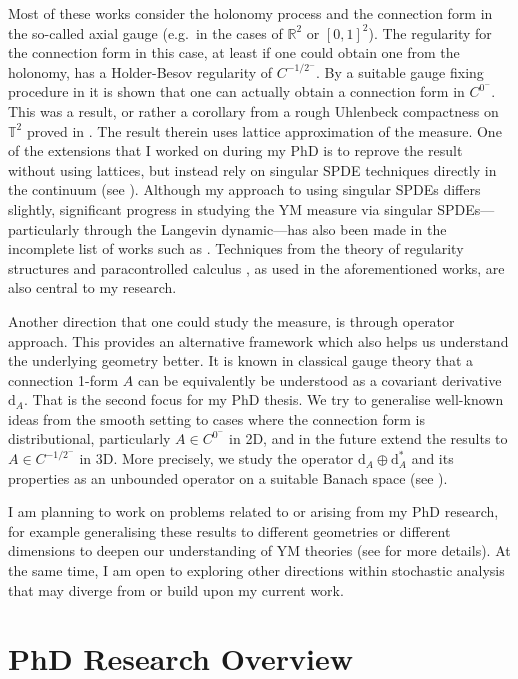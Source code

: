 \documentclass[12pt]{article}
\numberwithin{equation}{section}
\theoremstyle{definition}
\theoremstyle{remark}
\newcommand{\diff}{\mathrm{d}}
\newcommand{\R}{\mathbb R}
\newcommand{\1}{\mathbf 1}
\newcommand{\<}{\langle}
\renewcommand{\>}{\rangle}
\newcommand{\bT}{\mathbb T}
\begin{document}
Most of these works consider the holonomy process and the connection form in the so-called axial gauge (e.g.\ in the cases of $\R^2$ or $[0,1]^2$). The regularity for the connection form in this case, at least if one could obtain one from the holonomy, has a Holder-Besov regularity of $C^{-1/2^-}$. By a suitable gauge fixing procedure in \cite{Chevyrev19} it is shown that one can actually obtain a connection form in $C^{0^-}$. This was a result, or rather a corollary from a rough Uhlenbeck compactness on $\bT^2$ proved in \cite{Chevyrev19}. The result therein uses lattice approximation of the measure. One of the extensions that I worked on during my PhD is to reprove the result without using lattices, but instead rely on singular SPDE techniques directly in the continuum (see  ). Although my approach to using singular SPDEs differs slightly, significant progress in studying the YM measure via singular SPDEs—particularly through the Langevin dynamic—has also been made in the incomplete list of works such as  \cite{CCHS2d,CCHS3d,CH23,BC23,BC24}. Techniques from the theory of regularity structures \cite{Hairer14} and paracontrolled calculus \cite{GIP15}, as used in the aforementioned works, are also central to my research. 

Another direction that one could study the measure, is through operator approach. This provides an alternative framework which also helps us understand the underlying geometry better. It is known in classical gauge theory that a connection 1-form $A$ can be equivalently be understood as a covariant derivative $\diff_A$. That is the second focus for my PhD thesis. We try to generalise well-known ideas from the smooth setting to cases where the connection form is distributional, particularly $A\in C^{0^-}$ in 2D, and in the future extend the results to $A\in C^{-1/2^-}$ in 3D. More precisely, we study the operator $\diff_A\oplus\diff_A^*$ and its properties as an unbounded operator on a suitable Banach space (see ). 

I am planning to work on problems related to or arising from my PhD research, for example generalising these results to different geometries or different dimensions to deepen our understanding of YM theories (see  for more details).  At the same time, I am open to exploring other directions within stochastic analysis that may diverge from or build upon my current work.

\section{PhD Research Overview}
\end{document}
